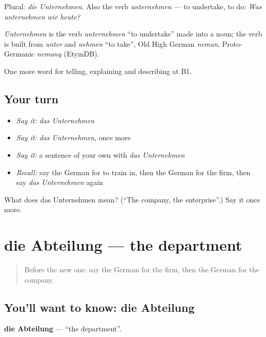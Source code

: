 Plural: \emph{die Unternehmen}. Also the verb \emph{unternehmen} — to undertake, to do: \emph{Was unternehmen wir heute?}

\begin{cousinweb}
\emph{Unternehmen} is the verb \emph{unternehmen} \textquotedblleft{}to undertake\textquotedblright{} made into a noun; the verb is built from \emph{unter} and \emph{nehmen} \textquotedblleft{}to take\textquotedblright{}, Old High German \emph{neman}, Proto-Germanic \emph{nemaną} (EtymDB).
\end{cousinweb}

\begin{grammarlens}[title={What you've built}]
One more word for telling, explaining and describing at B1.
\end{grammarlens}

\subsection*{Your turn}
\begin{itemize}
\raggedright
  \item \emph{Say it:} \emph{das Unternehmen}
  \item \emph{Say it:} \emph{das Unternehmen}, once more
  \item \emph{Say it:} a sentence of your own with \emph{das Unternehmen}
  \item \emph{Recall:} say the German for to train in, then the German for the firm, then say \emph{das Unternehmen} again
\end{itemize}

\begin{tcolorbox}[breakable,colback=teal!4,colframe=teal!35!black,title={Before you move on}]
What does das Unternehmen mean? (\textquotedblleft{}The company, the enterprise\textquotedblright{}.) Say it once more.
\end{tcolorbox}
\section[die Abteilung]{die Abteilung — the department}

\label{lesson:GE-C353-abteilung}



\begin{quote}
Before the new one: say the German for the firm, then the German for the company.
\end{quote}

\subsection*{You'll want to know: die Abteilung}
\textbf{die Abteilung} — \textquotedblleft{}the department\textquotedblright{}.

